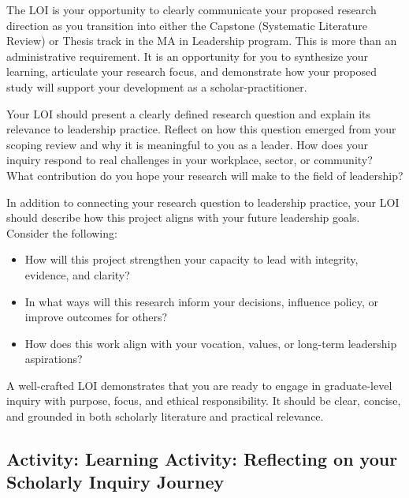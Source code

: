 \documentclass[
  letterpaper,
  DIV=11,
  numbers=noendperiod]{scrreprt}
\providecommand{\tightlist}{%
  \setlength{\itemsep}{0pt}\setlength{\parskip}{0pt}}\usepackage{longtable,booktabs,array}
\begin{document}

The LOI is your opportunity to clearly communicate your proposed
research direction as you transition into either the Capstone
(Systematic Literature Review) or Thesis track in the MA in Leadership
program. This is more than an administrative requirement. It is an
opportunity for you to synthesize your learning, articulate your
research focus, and demonstrate how your proposed study will support
your development as a scholar-practitioner.

Your LOI should present a clearly defined research question and explain
its relevance to leadership practice. Reflect on how this question
emerged from your scoping review and why it is meaningful to you as a
leader. How does your inquiry respond to real challenges in your
workplace, sector, or community? What contribution do you hope your
research will make to the field of leadership?

In addition to connecting your research question to leadership practice,
your LOI should describe how this project aligns with your future
leadership goals. Consider the following:

\begin{itemize}
\tightlist
\item
  How will this project strengthen your capacity to lead with integrity,
  evidence, and clarity?
\item
  In what ways will this research inform your decisions, influence
  policy, or improve outcomes for others?
\item
  How does this work align with your vocation, values, or long-term
  leadership aspirations?
\end{itemize}

A well-crafted LOI demonstrates that you are ready to engage in
graduate-level inquiry with purpose, focus, and ethical responsibility.
It should be clear, concise, and grounded in both scholarly literature
and practical relevance.

\subsection*{Activity: Learning Activity: Reflecting on your Scholarly
Inquiry
Journey}\label{activity-learning-activity-reflecting-on-your-scholarly-inquiry-journey}
\end{document}
